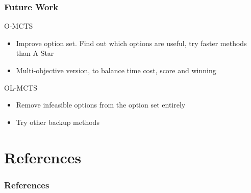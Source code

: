 \documentclass[aspectratio=169]{beamer}
\begin{document}
\begin{frame}
	\frametitle{Future Work}
	\begin{block}{O-MCTS}
		\begin{itemize}
			\item Improve option set. Find out which options are useful, try
				faster methods than A Star
			\item Multi-objective version, to balance time cost, score and
				winning
		\end{itemize}
	\end{block}
	\begin{block}{OL-MCTS}
		\begin{itemize}
			\item Remove infeasible options from the option set entirely
			\item Try other backup methods
		\end{itemize}
	\end{block}
\end{frame}

\section{References}
\begin{frame}%
	\frametitle{References}
	\tiny{ }
	
\end{frame}
\end{document}
